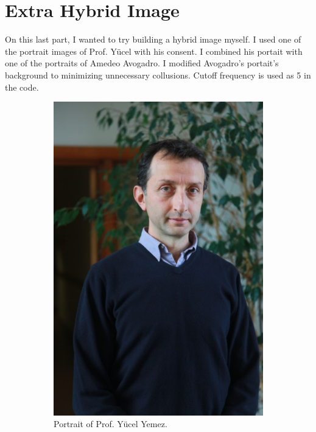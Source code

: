 \documentclass{article}
\begin{document}
\newpage
\section{Extra Hybrid Image}

On this last part, I wanted to try building a hybrid image myself. I used one of the portrait images of Prof. Y\"ucel with his consent. I combined his portait with one of the portraits of Amedeo Avogadro. I modified Avogadro's portait's background to minimizing unnecessary collusions. Cutoff frequency is used as 5 in the code.

\begin{figure}[!htb]
\begin{subfigure}{.4\textwidth}
  \centering
  \includegraphics[width=.8\textwidth]{yyemez.jpg}
  \caption{Portrait of Prof. Y\"ucel Yemez.}
\end{subfigure}%
\begin{subfigure}{.4\textwidth}
  \centering

\end{subfigure}
\end{figure}
\end{document}
